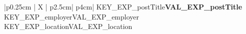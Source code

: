 %
%
\iftrue %
\begin{myTableEnv}{|p{0.25cm} | X | p{2.5cm}| p{4cm}|}%
    \myRow
        {KEY_EXP_postTitle}{\bfseries VAL_EXP_postTitle} %
        {KEY_EXP_employer}{VAL_EXP_employer} %
    \myRow
        {}{}%
        {KEY_EXP_location}{VAL_EXP_location}%
\end{myTableEnv}%
%
%
\myTablesSeparator
%
%
\fi
%
%